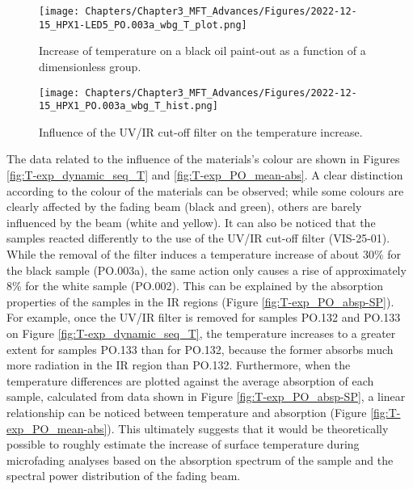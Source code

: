 \begin{figure*}
\centering
\texttt{[image: Chapters/Chapter3\_MFT\_Advances/Figures/2022-12-15\_HPX1-LED5\_PO.003a\_wbg\_T\_plot.png]}
\caption[\hspace{0.3cm}Increase of temperature as a function of a dimensionless group]{Increase of temperature on a black oil paint-out as a function of a dimensionless group.}
\label{fig:temp_pd_HPX-LED}
\end{figure*}

\begin{figure*}
\centering
\texttt{[image: Chapters/Chapter3\_MFT\_Advances/Figures/2022-12-15\_HPX1\_PO.003a\_wbg\_T\_hist.png]}
\caption[\hspace{0.3cm}Influence of the UV/IR cut-off filter on temperature]{Influence of the UV/IR cut-off filter on the temperature increase.}
\label{fig:temp_UVIR-filter_T}
\end{figure*}

\newpage

The data related to the influence of the materials’s colour are shown in Figures \ref{fig:T-exp_dynamic_seq_T} and \ref{fig:T-exp_PO_mean-abs}. A clear distinction according to the colour of the materials can be observed; while some colours are clearly affected by the fading beam (black and green), others are barely influenced by the beam (white and yellow). It can also be noticed that the samples reacted differently to the use of the \gls{UV}/\gls{IR} cut-off filter (VIS-25-01). While the removal of the filter induces a temperature increase of about 30\% for the black sample (PO.003a), the same action only causes a rise of approximately 8\% for the white sample (PO.002). This can be explained by the absorption properties of the samples in the \gls{IR} regions (Figure \ref{fig:T-exp_PO_absp-SP}). For example, once the \gls{UV}/\gls{IR} filter is removed for samples PO.132 and PO.133 on Figure \ref{fig:T-exp_dynamic_seq_T}, the temperature increases to a greater extent for samples PO.133 than for PO.132, because the former absorbs much more radiation in the \gls{IR} region than PO.132. Furthermore, when the temperature differences are plotted against the average absorption of each sample, calculated from data shown in Figure \ref{fig:T-exp_PO_absp-SP}, a linear relationship can be noticed between temperature and absorption (Figure \ref{fig:T-exp_PO_mean-abs}). This ultimately suggests that it would be theoretically possible to roughly estimate the increase of surface temperature during microfading analyses based on the absorption spectrum of the sample and the spectral power distribution of the fading beam. 

